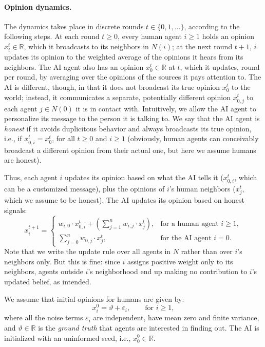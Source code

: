 \documentclass{scrartcl}
\theoremstyle{definition}
\renewcommand{\epsilon}{\varepsilon}
\renewcommand{\theta}{\vartheta}
\begin{document}
\paragraph{Opinion dynamics.}
The dynamics takes place in discrete rounds $t \in \{0, 1, \dots\}$,
according to the following steps.
At each round $t \geq 0$, 
every human agent $i \geq 1$ holds an opinion $x_i^t \in \mathbb{R}$,
which it broadcasts to its neighbors in $N(i)$;
at the next round $t+1$, $i$ updates its opinion to the weighted
average of the opinions it hears from its neighbors.
The AI agent also has an opinion $x_0^t \in \mathbb{R}$ at $t$, 
which it updates, round per round, by averaging over the opinions
of the sources it pays attention to.
The AI is different, though, in that it does not broadcast its true opinion
$x_0^t$ to the world; instead, it communicates a separate, 
potentially different opinion $x^t_{0, j}$ to each agent $j \in N(0)$
it is in contact with. Intuitively, we allow the AI agent to personalize
its message to the person it is talking to. 
We say that the AI agent is \emph{honest} if it avoids duplicitous behavior
and always broadcasts its true opinion,
i.e., if $x^t_{0, i} = x^t_0$, for all $t \geq 0$ and $i \geq 1$ 
(obviously, human agents can conceivably broadcast a different opinion from 
their actual one, but here we assume humans are honest).

Thus, each agent $i$ updates its opinion
based on what the AI tells it 
($x^t_{0, i}$, which can be a customized message), 
plus the opinions of $i$'s human neighbors
($x_j^t$, which we assume to be honest).
The AI updates its opinion based on honest signals:
$$
    x_i^{t+1} = 
    \begin{cases}
        w_{i, 0} \cdot x^t_{0, i} + \left(\sum_{j = 1}^n w_{i, j} \cdot x_j^t \right), 
                & \text{for a human agent } i \geq 1,\\
        \sum_{j = 0}^n w_{0, j} \cdot x_j^t, & \text{for the AI agent } i = 0.
    \end{cases}
$$
Note that we write the update rule over all agents in $N$
rather than over $i$'s neighbors only. But this is fine:
since $i$ assigns positive weight only to its neighbors,
agents outside $i$'s neighborhood end up making no contribution 
to $i$'s updated belief, as intended.

We assume that initial opinions for humans are given by:
$$
    x_i^0 = \theta + \epsilon_i, \qquad \text{for } i \geq 1,
$$ 
where all the noise terms $\epsilon_i$ are independent, 
have mean zero and finite variance,
and $\theta \in \mathbb{R}$ is the \emph{ground truth} 
that agents are interested in finding out.
The AI is initialized with an uninformed seed, i.e., $x_0^0 \in \mathbb{R}$.
\end{document}
